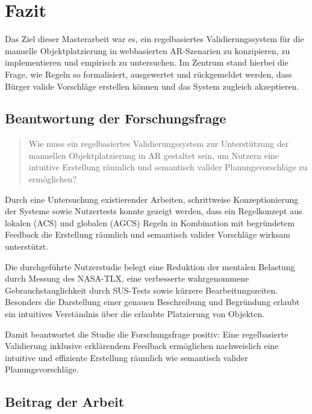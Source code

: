 \section{Fazit}\label{section:Fazit}


Das Ziel dieser Masterarbeit war es, ein regelbasiertes Validierungssystem für die manuelle Objektplatzierung in webbasierten AR-Szenarien zu konzipieren, zu implementieren und empirisch zu untersuchen. Im Zentrum stand hierbei die Frage, wie Regeln so formalisiert, ausgewertet und rückgemeldet werden, dass Bürger valide Vorschläge erstellen können und das System zugleich akzeptieren.

\subsection{Beantwortung der Forschungsfrage}

\begin{quote}
Wie muss ein regelbasiertes Validierungssystem zur Unterstützung der manuellen Objektplatzierung in AR gestaltet sein, um Nutzern eine intuitive Erstellung räumlich und semantisch valider Planungsvorschläge zu ermöglichen?
\end{quote}

Durch eine Untersuchung existierender Arbeiten, schrittweise Konzeptionierung der Systeme sowie Nutzertests konnte gezeigt werden, dass ein Regelkonzept aus lokalen (ACS) und globalen (AGCS) Regeln in Kombination mit begründetem Feedback die Erstellung räumlich und semantisch valider Vorschläge wirksam unterstützt.

Die durchgeführte Nutzerstudie belegt eine Reduktion der mentalen Belastung durch Messung des NASA-TLX, eine verbesserte wahrgenommene Gebrauchstauglichkeit durch SUS-Tests sowie kürzere Bearbeitungszeiten. Besonders die Darstellung einer genauen Beschreibung und Begründung erlaubt ein intuitives Verständnis über die erlaubte Platzierung von Objekten.

Damit beantwortet die Studie die Forschungsfrage positiv: Eine regelbasierte Validierung inklusive erklärendem Feedback ermöglichen nachweislich eine intuitive und effiziente Erstellung räumlich wie semantisch valider Planungsvorschläge.

\subsection{Beitrag der Arbeit}

